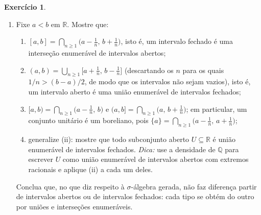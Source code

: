 \documentclass[12pt,portuguese]{article}
\theoremstyle{definition}
\theoremstyle{plainexercise}
\newtheorem{exercise}{Exercício}
\theoremstyle{starredexercise}
\theoremstyle{definition}
\begin{document}
\begin{exercise}
\begin{enumerate}[label=\textbf{(\alph*)}, leftmargin=*, itemsep=0.6em]
    \item Fixe $a < b$ em $\mathbb{R}$. Mostre que:
    \begin{enumerate}[label=(\roman*)]
      \item $[a,b] = \bigcap_{n \geqslant 1} \bigl(a - \tfrac{1}{n},\,
        b + \tfrac{1}{n}\bigr)$, isto é, um intervalo fechado é uma
        interseção enumerável de intervalos abertos;
      \item $(a,b) = \bigcup_{n \geqslant 1} \bigl[a + \tfrac{1}{n},\,
        b - \tfrac{1}{n}\bigr]$ (descartando os $n$ para os quais
        $1/n > (b-a)/2$, de modo que os intervalos não sejam
        vazios), isto é, um intervalo aberto é uma união enumerável de
        intervalos fechados;
      \item $[a,b) = \bigcap_{n \geqslant 1} \bigl(a - \tfrac{1}{n},\, b\bigr)$
        e $(a,b] = \bigcap_{n \geqslant 1} \bigl(a,\, b + \tfrac{1}{n}\bigr)$;
        em particular, um conjunto unitário é um boreliano, pois
        $\{a\} = \bigcap_{n \geqslant 1}\bigl(a - \tfrac{1}{n},\,
        a + \tfrac{1}{n}\bigr)$;
      \item generalize (ii): mostre que todo subconjunto aberto
        $U \subseteq \mathbb{R}$ é união enumerável de intervalos fechados.
        \emph{Dica:} use a densidade de $\mathbb{Q}$ para escrever $U$ como
        união enumerável de intervalos abertos com extremos racionais e
        aplique (ii) a cada um deles.
    \end{enumerate}
    Conclua que, no que diz respeito à $\sigma$-álgebra gerada, não faz
    diferença partir de intervalos abertos ou de intervalos fechados: cada
    tipo se obtém do outro por uniões e interseções enumeráveis.


\end{enumerate}
\end{exercise}
\end{document}

